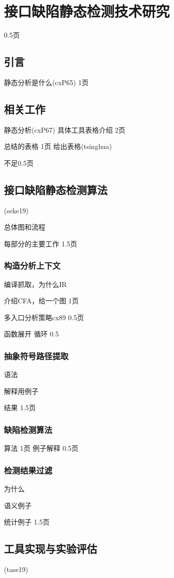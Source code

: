 \chapter{接口缺陷静态检测技术研究}
\label{cha:imchecker}
0.5页

\section{引言}
静态分析是什么(cxP65)
1页

\section{相关工作}

静态分析(cxP67)
具体工具表格介绍
2页

总结的表格
1页
给出表格(tsinghua)

不足0.5页


\section{接口缺陷静态检测算法}
(seke19)

总体图和流程

每部分的主要工作
1.5页

\subsection{构造分析上下文}
编译抓取，为什么IR

介绍CFA，给一个图
1页

多入口分析策略cx89
0.5页

函数展开
循环
0.5

\subsection{抽象符号路径提取}
语法

解释用例子

结果
1.5页
\subsection{缺陷检测算法}
算法
1页
例子解释
0.5页
\subsection{检测结果过滤}
为什么

语义例子

统计例子
1.5页
\section{工具实现与实验评估}
(tase19)
